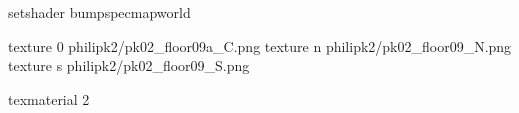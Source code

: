setshader bumpspecmapworld

texture 0 philipk2/pk02_floor09a_C.png
texture n philipk2/pk02_floor09_N.png
texture s philipk2/pk02_floor09_S.png

texmaterial 2
